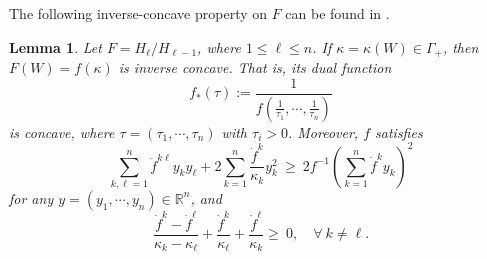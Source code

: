 \documentclass[11pt,reqno]{amsart}
\newtheorem{lem}[thm]{Lemma}
\theoremstyle{definition}
\theoremstyle{remark}
\numberwithin{equation}{section}
\renewcommand{\(}{\left(}
\renewcommand{\)}{\right)}
\renewcommand{\-}{\overline}
\renewcommand{\k}{\kappa}
\newcommand{\G}{\Gamma}
\begin{document}
The following inverse-concave property on $F$ can be found in \cite{And2007,AW18,WeiX15}.
\begin{lem}
Let $F={H_\ell}/{H_{\ell-1}}$, where $1\leq \ell\leq n$. If $\k=\kappa(W)\in \G_{+}$, then $F(W)=f(\kappa)$ is inverse concave. That is, its dual function
\begin{equation*}
  f_*(\tau):=\frac{1}{f(\frac{1}{\tau_1},\cdots,\frac{1}{\tau_n})}
\end{equation*}
is concave, where $\tau=(\tau_1,\cdots,\tau_n)$ with $\tau_i>0$. Moreover, $f$ satisfies
 \begin{equation}\label{s2.d2F}
   \sum_{k,\ell=1}^n\ddot{f}^{k\ell}y_ky_\ell+2\sum_{k=1}^n\frac {\dot{f}^k}{\kappa_k}y_k^2~\geq ~2f^{-1}(\sum_{k=1}^n\dot{f}^ky_k)^2
 \end{equation}
 for any $y=(y_1,\cdots,y_n)\in \mathbb{R}^n$, and
\begin{equation}\label{s2:inv-conc}
\frac{\dot{f}^k-\dot{f}^\ell}{\kappa_k-\kappa_\ell}+\frac{\dot{f}^k}{\kappa_\ell}+\frac{\dot{f}^\ell}{\kappa_k}\geq~0,\quad \forall~k\neq \ell.
\end{equation}
\end{lem}
\end{document}
